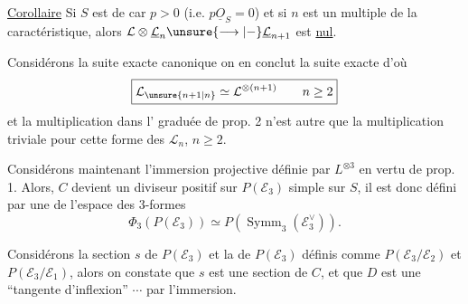 \uline{Corollaire} Si $S$ est de car $p>0$ (i.e. $p\underline O_S=0$) et si $n$ est un multiple de la caractéristique, alors $\mathcal L\otimes\underline{\mathcal L}_n\unsure{\longrightarrow|-}\underline{\mathcal L}_{n+1}$ est \uline{nul}.

 Considérons la suite exacte canonique
on en conclut la suite exacte
d'où
\[
\boxed{\mathcal L_{\unsure{n+1|n}}\simeq\mathcal L^{\otimes(n+1)}\qquad n\geq2}
\]
et la multiplication dans l' graduée de prop. 2 n'est autre que la multiplication triviale pour cette forme des $\mathcal L_n$, $n\geq2$.



Considérons maintenant l'immersion projective
définie par $L^{\otimes3}$ en vertu de prop. 1. Alors, $C$ devient un diviseur positif sur $P(\mathcal E_3)$ simple sur $S$,  il est donc défini par une   de l'espace des $3$-formes
\[
\Phi_3(P(\mathcal E_3))\simeq P(\operatorname{Symm}_3(\mathcal E_3^\vee)).
\]


Considérons la section $s$ de $P(\mathcal E_3)$ et la   de $P(\mathcal E_3)$ définis comme $P(\mathcal E_3/\mathcal E_2)$ et $P(\mathcal E_3/\mathcal E_1)$, alors on constate que $s$ est une section de $C$, et que $D$ est une ``tangente d'inflexion'' $\cdots$ par l'immersion.

